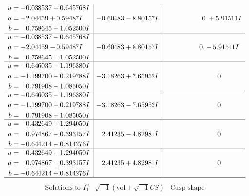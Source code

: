\documentclass[1p]{elsarticle_modified}
\theoremstyle{definition}
\newcommand{\I}{\sqrt{-1}}
\begin{document}
$$\begin{array}{c|c|c}
\begin{aligned}
u &= -0.038537 + 0.645768 I \\
a &= -2.04459 + 0.59487 I \\
b &= \phantom{-}0.758645 + 1.052500 I\end{aligned}
 & -0.60483 - 8.80157 I & \phantom{-0.000000 -}0. + 5.91511 I \\ \hline\begin{aligned}
u &= -0.038537 - 0.645768 I \\
a &= -2.04459 - 0.59487 I \\
b &= \phantom{-}0.758645 - 1.052500 I\end{aligned}
 & -0.60483 + 8.80157 I & \phantom{-0.000000 } 0. - 5.91511 I \\ \hline\begin{aligned}
u &= -0.646035 + 1.196380 I \\
a &= -1.199700 - 0.219788 I \\
b &= \phantom{-}0.791908 - 1.085050 I\end{aligned}
 & -3.18263 + 7.65952 I & \phantom{-0.000000 } 0 \\ \hline\begin{aligned}
u &= -0.646035 - 1.196380 I \\
a &= -1.199700 + 0.219788 I \\
b &= \phantom{-}0.791908 + 1.085050 I\end{aligned}
 & -3.18263 - 7.65952 I & \phantom{-0.000000 } 0 \\ \hline\begin{aligned}
u &= \phantom{-}0.432649 + 1.294050 I \\
a &= \phantom{-}0.974867 - 0.393157 I \\
b &= -0.644214 - 0.814276 I\end{aligned}
 & \phantom{-}2.41235 - 4.82981 I & \phantom{-0.000000 } 0 \\ \hline\begin{aligned}
u &= \phantom{-}0.432649 - 1.294050 I \\
a &= \phantom{-}0.974867 + 0.393157 I \\
b &= -0.644214 + 0.814276 I\end{aligned}
 & \phantom{-}2.41235 + 4.82981 I & \phantom{-0.000000 } 0\\
 \hline 
 \end{array}$$\newpage$$\begin{array}{c|c|c}  
\text{Solutions to }I^u_{1}& \I (\text{vol} + \sqrt{-1}CS) & \text{Cusp shape}\\
 \hline 
\begin{aligned}

\end{aligned}
\end{array}$$
\end{document}
